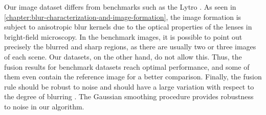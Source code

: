 Our image dataset differs from benchmarks such as the Lytro \cite{nejati2015multi}. As seen in \autoref{chapter:blur-characterization-and-image-formation}, the image formation is subject to anisotropic blur kernels due to the optical properties of the lenses in bright-field microscopy. In the benchmark images, it is possible to point out precisely the blurred and sharp regions, as there are usually two or three images of each scene. Our datasets, on the other hand, do not allow this. Thus, the fusion results for benchmark datasets reach optimal performance, and some of them even contain the reference image for a better comparison. Finally, the fusion rule should be robust to noise and should have a large variation with respect to the degree of blurring \cite{huang2007evaluation}. The Gaussian smoothing procedure provides robustness to noise in our algorithm. 